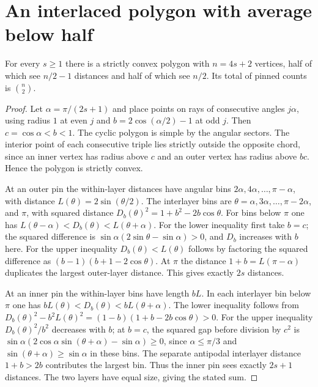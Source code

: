 \section{An interlaced polygon with average below half}

\begin{proposition}[982-X04]
For every \(s\ge1\) there is a strictly convex polygon with \(n=4s+2\)
vertices, half of which see \(n/2-1\) distances and half of which see \(n/2\).
Its total of pinned counts is \(\binom n2\).
\end{proposition}
\begin{proof}
Let \(\alpha=\pi/(2s+1)\) and place points on rays of consecutive angles
\(j\alpha\), using radius \(1\) at even \(j\) and
\(b=2\cos(\alpha/2)-1\) at odd \(j\). Then \(c=\cos\alpha<b<1\).
The cyclic polygon is simple by the angular sectors. The interior point
of each consecutive triple lies strictly outside the opposite chord,
since an inner vertex has radius above \(c\) and an outer vertex has
radius above \(bc\). Hence the polygon is strictly convex.

At an outer pin the within-layer distances have angular bins
\(2\alpha,4\alpha,\ldots,\pi-\alpha\), with distance \(L(\theta)=2\sin(\theta/2)\).
The interlayer bins are \(\theta=\alpha,3\alpha,\ldots,\pi-2\alpha\), and \(\pi\),
with squared distance \(D_b(\theta)^2=1+b^2-2b\cos\theta\).
For bins below \(\pi\) one has
\(L(\theta-\alpha)<D_b(\theta)<L(\theta+\alpha)\).
For the lower inequality first take \(b=c\); the squared difference is
\(\sin\alpha(2\sin\theta-\sin\alpha)>0\), and \(D_b\) increases with \(b\)
here. For the upper inequality \(D_b(\theta)<L(\theta)\) follows by
factoring the squared difference as \((b-1)(b+1-2\cos\theta)\).
At \(\pi\) the distance \(1+b=L(\pi-\alpha)\) duplicates the largest
outer-layer distance. This gives exactly \(2s\) distances.

At an inner pin the within-layer bins have length \(bL\). In each interlayer
bin below \(\pi\) one has \(bL(\theta)<D_b(\theta)<bL(\theta+\alpha)\).
The lower inequality follows from
\(D_b(\theta)^2-b^2L(\theta)^2=(1-b)(1+b-2b\cos\theta)>0\). For the upper
inequality \(D_b(\theta)^2/b^2\) decreases with \(b\); at \(b=c\), the
squared gap before division by \(c^2\) is
\(\sin\alpha(2\cos\alpha\sin(\theta+\alpha)-\sin\alpha)\ge0\), since
\(\alpha\le\pi/3\) and \(\sin(\theta+\alpha)\ge\sin\alpha\) in these bins.
The separate antipodal interlayer distance \(1+b>2b\) contributes the
largest bin. Thus the inner pin sees exactly \(2s+1\) distances. The
two layers have equal size, giving the stated sum.
\end{proof}
